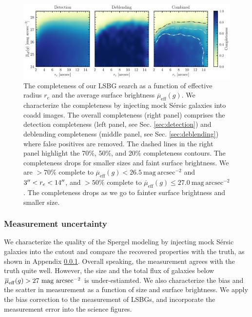 \documentclass[twocolumn,astrosymb,twocolappendix]{aastex631}
\newcommand{\sbunit}{\mathrm{mag\ arcsec}^{-2}}
\newcommand{\sbeff}{\overline{\mu}_{\mathrm{eff}}(g)}
\newcommand{\sersic}{S\'ersic}
\begin{document}
\begin{CJK*}{UTF8}{gbsn}
\begin{figure}
	\vbox{ 
		\centering
		\includegraphics[width=1\linewidth]{completeness.pdf}
	}
	\caption{The completeness of our LSBG search as a function of effective radius $r_e$ and the average surface brightness $\sbeff$. We characterize the completeness by injecting mock \sersic{} galaxies into coadd images. The overall completeness (right panel) comprises the detection completeness (left panel, see Sec. \ref{sec:detection}) and deblending completeness (middle panel, see Sec. \ref{sec:deblending}) where false positives are removed. The dashed lines in the right panel highlight the 70\%, 50\%, and 20\% completeness contours. The completeness drops for smaller sizes and faint surface brightness. We are $>70\%$ complete to $\sbeff < 26.5\ \sbunit$ and $3\mbox{$^{\prime\prime}$} < r_e < 14\mbox{$^{\prime\prime}$}$, and $>50\%$ complete to $\sbeff \leqslant 27.0\ \sbunit$. The completeness drops as we go to fainter surface brightness and smaller size. 
	}
	\label{fig:completeness}
\end{figure}

\subsubsection{Measurement uncertainty}\label{sec:meas_unc}


We characterize the quality of the Spergel modeling by injecting mock \sersic{} galaxies into the cutout and compare the recovered properties with the truth, as shown in Appendix \ref{sec:meas_unc}. Overall speaking, the measurement agrees with the truth quite well. However, the size and the total flux of galaxies below $\overline{\mu}_{\rm eff} (g) > 27\ \sbunit$ is under-estiamted. We also characterize the bias and the scatter in measurement as a function of size and surface brightness. We apply the bias correction to the measurement of LSBGs, and incorporate the measurement error into the science figures. 


\end{CJK*}
\end{document}
